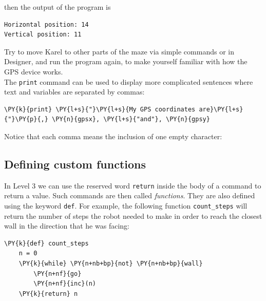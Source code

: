 \noindent
then the output of the program is\\

\begin{ybox}
\begin{verbatim}
Horizontal position: 14
Vertical position: 11
\end{verbatim}
\end{ybox}
\vspace{6mm}

\noindent
Try to move Karel to other parts of the maze via simple commands or in Designer, 
and run the program again, to make yourself familiar with how the GPS device works.\\

\noindent
The {\tt print} command can be used to display more complicated sentences where text
and variables are separated by commas:\\

\begin{bbox}
\begin{Verbatim}[commandchars=\\\{\}]
\PY{k}{print} \PY{l+s}{"}\PY{l+s}{My GPS coordinates are}\PY{l+s}{"}\PY{p}{,} \PY{n}{gpsx}, \PY{l+s}{"and"}, \PY{n}{gpsy}
\end{Verbatim}
\end{bbox}
\vspace{6mm}

\noindent
Notice that each comma means the inclusion of one empty character:


\subsection[\ \ Defining custom functions]{Defining custom functions}

In Level 3 we can use the reserved word {\tt return} inside the body of
a command to return a value. Such commands are then called {\em functions}. 
They are also defined using the keyword {\tt def}. For example, the following function
{\tt count\_steps} will return the number of steps the robot needed to 
make in order to reach the closest wall in the direction that he was facing:\\

\begin{bbox}
\begin{Verbatim}[commandchars=\\\{\}]
\PY{k}{def} count_steps
    n = 0
    \PY{k}{while} \PY{n+nb+bp}{not} \PY{n+nb+bp}{wall}
        \PY{n+nf}{go}
        \PY{n+nf}{inc}(n)
    \PY{k}{return} n
\end{Verbatim}
\end{bbox}
\vspace{6mm}

